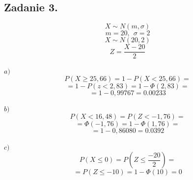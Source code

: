 \subsection{Zadanie 3.}

$$ X \sim N ( m, \sigma )$$
$$ m = 20, \ \ \sigma = 2 $$
$$ X \sim N ( 20, 2 )$$
$$ Z = \frac{X - 20}{2} $$  \\

$a)$ 
$$ P( X \ge 25,66 ) = 1 - P( X < 25,66 ) = $$
$$ = 1 - P(z < 2,83) = 1 - \Phi(2,83) = $$
$$ = 1 -  0,99767 = 0.00233$$ \\

$b)$ 
$$ P( X < 16,48 ) =  P( Z < -1,76 ) = $$
$$ = \Phi(-1,76) = 1 - \Phi(1,76) = $$
$$ = 1 -  0,86080 = 0.0392$$ \\

$c)$ 
$$ P( X \le 0 ) =  P( Z \le \frac{-20}{2} ) = $$
$$ = P( Z \le -10) = 1 - \Phi(10) = 0 $$
